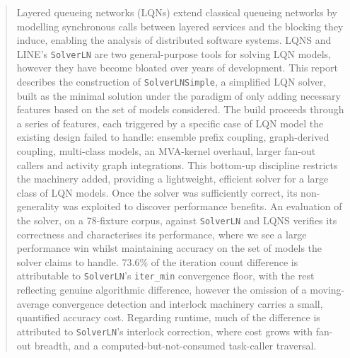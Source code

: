 \begin{abstract}
\noindent
Layered queueing networks (LQNs) extend classical queueing networks by 
modelling synchronous calls between layered services and the blocking they induce, enabling the analysis of distributed software systems. 
LQNS and LINE's \texttt{SolverLN} are two general-purpose tools for solving LQN models, however they have become bloated over years of development.
This
report describes the construction of \texttt{SolverLNSimple},
a simplified LQN solver, built as the minimal solution under the paradigm of only adding necessary features based on the set of models considered. The build proceeds through a series of features, each triggered by a specific case of LQN model the existing design failed to handle: ensemble prefix coupling, graph-derived coupling, multi-class models, an MVA-kernel overhaul, larger fan-out callers and activity graph integrations. 
This bottom-up discipline restricts the machinery added, providing a lightweight, efficient solver for a large class of LQN models. Once the solver was sufficiently correct, its non-generality was exploited to discover performance benefits.
An evaluation of the solver, on a 78-fixture corpus, against \texttt{SolverLN} and LQNS verifies its correctness and characterises its performance, where we see a large performance win whilst maintaining accuracy on the set of models the solver claims to handle. 
73.6\% of the iteration count difference is attributable to \texttt{SolverLN}'s \texttt{iter\_min} convergence floor, with the rest reflecting genuine algorithmic difference, however the omission of a moving-average convergence detection and interlock machinery carries a small, quantified accuracy cost.
Regarding runtime, much of the difference is attributed to \texttt{SolverLN}'s interlock correction, where cost grows with fan-out breadth, and a computed-but-not-consumed task-caller traversal. 
\end{abstract}
